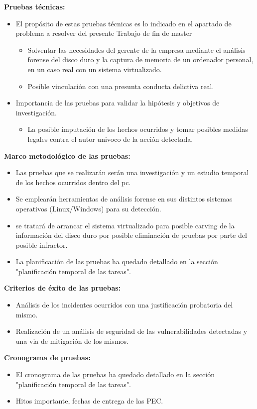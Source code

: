 \textbf{Pruebas técnicas:}

\begin{itemize}
    \item El propósito de estas pruebas técnicas es lo indicado en el apartado de problema a resolver del presente Trabajo de fin de master
    \begin{itemize}
        \item Solventar las necesidades del gerente de la empresa mediante el análisis forense del disco duro y la captura de memoria de un ordenador personal, en un caso real con un sistema virtualizado.
        \item Posible vinculación con una presunta conducta delictiva real.
    \end{itemize}
    \item Importancia de las pruebas para validar la hipótesis y objetivos de investigación.
    \begin{itemize}
        \item La posible imputación de los hechos ocurridos y tomar posibles medidas legales contra el autor univoco de la acción detectada.
    \end{itemize}
\end{itemize}

\textbf{Marco metodológico de las pruebas:}

\begin{itemize}
    \item Las pruebas que se realizarán serán una investigación y un estudio temporal de los hechos ocurridos dentro del pc.
    \item Se emplearán herramientas de análisis forense en sus distintos sistemas operativos (Linux/Windows) para su detección.
    \item se tratará de arrancar el sistema virtualizado para posible carving de la información del disco duro por posible eliminación de pruebas por parte del posible infractor.
    \item La planificación de las pruebas ha quedado detallado en la sección "planificación temporal de las tareas".
\end{itemize}


\textbf{Criterios de éxito de las pruebas:}

\begin{itemize}
    \item Análisis de los incidentes ocurridos con una justificación probatoria del mismo.
    \item Realización de un análisis de seguridad de las vulnerabilidades detectadas y una via de mitigación de los mismos.
\end{itemize}

\textbf{Cronograma de pruebas:}

\begin{itemize}
    \item El cronograma de las pruebas ha quedado detallado en la sección "planificación temporal de las tareas".
    \item Hitos importante, fechas de entrega de las PEC.
\end{itemize}

